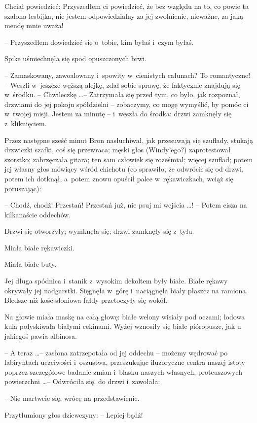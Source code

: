 \documentclass[oneside,polish,11pt,rmheadings]{mwbk}
\begin{document}
Chciał powiedzieć:  Przyszedłem ci powiedzieć, że bez względu na to, co powie ta szalona lesbijka, nie jestem odpowiedzialny za jej zwolnienie, nieważne, za jaką mendę mnie uważa!  

-- Przyszedłem dowiedzieć się o~tobie, kim byłaś i~czym byłaś. 

Spike uśmiechnęła się spod opuszczonych brwi. 

-- Zamaskowany, zawoalowany i~spowity w~cienistych całunach? To romantyczne! -- Weszli w~jeszcze węższą alejkę, zdał sobie sprawę, że faktycznie znajdują się w~środku. -- Chwileczkę \ldots  -- Zatrzymała się przed tym, co było, jak rozpoznał, drzwiami do jej pokoju spółdzielni -- zobaczymy, co mogę wymyślić, by pomóc ci w~twojej misji. Jestem za minutę -- i~weszła do środka: drzwi zamknęły się z~kliknięciem. 

Przez następne sześć minut Bron nasłuchiwał, jak przesuwają się szuflady, stukają drzwiczki szafki, coś się przewraca; męski głos (Windy'ego?) zaprotestował szorstko; zabrzęczała gitara; ten sam człowiek się roześmiał; więcej szuflad; potem jej własny głos mówiący wśród chichotu (co sprawiło, że odwrócił się od drzwi, potem ich dotknął, a~potem znowu opuścił palce w~rękawiczkach, wciąż się poruszając): 

-- Chodź, chodź! Przestań! Przestań już, nie psuj mi wejścia \ldots ! -- Potem cisza na kilkanaście oddechów. 

Drzwi się otworzyły; wymknęła się; drzwi zamknęły się z~tyłu. 

Miała białe rękawiczki. 

Miała białe buty. 

Jej długa spódnica i~stanik z~wysokim dekoltem były białe. Białe rękawy okrywały jej nadgarstki. Sięgnęła w~górę i~naciągnęła biały płaszcz na ramiona. Bledsze niż kość słoniowa fałdy przetoczyły się wokół. 

Na głowie miała maskę na całą głowę: białe welony wisiały pod oczami; lodowa kula połyskiwała białymi cekinami. Wyżej wznosiły się białe pióropusze, jak u jakiegoś pawia albinosa. 

-- A teraz \ldots  -- zasłona zatrzepotała od jej oddechu -- możemy wędrować po labiryntach uczciwości i~oszustwa, przeszukując iluzoryczne centra naszej istoty poprzez szczegółowe badanie zmian i~blasku naszych własnych, proteuszowych powierzchni \ldots  -- Odwróciła się. do drzwi i~zawołała: 

-- Nie martwcie się, wrócę na przedstawienie. 

Przytłumiony głos dziewczyny: -- Lepiej bądź!  
\end{document}
